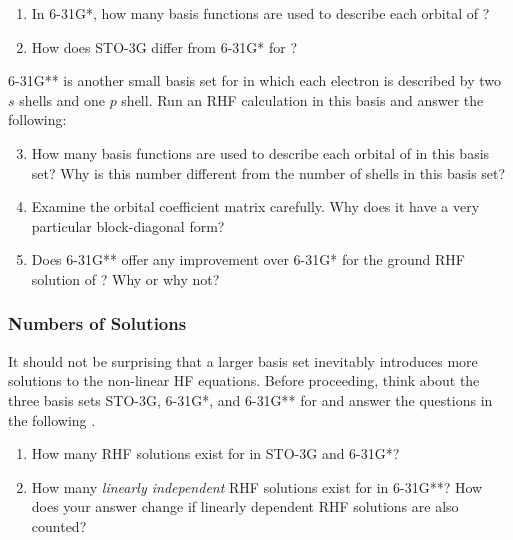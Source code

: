 			\begin{Task}
				\begin{enumerate}[topsep=0pt,itemsep=-1ex,partopsep=1ex,parsep=1ex,label=(\alph*)]
					\item In 6-31G*, how many basis functions are used to describe each orbital of ?
					\item How does STO-3G differ from 6-31G* for ?
				\end{enumerate}
				6-31G** is another small basis set for  in which each electron is described by two $s$ shells and one $p$ shell. Run an RHF calculation in this basis and answer the following:
					\begin{enumerate}[topsep=0pt,itemsep=-1ex,partopsep=1ex,parsep=1ex,label=(\alph*)]
							\setcounter{enumi}{2}
							\item How many basis functions are used to describe each orbital of  in this basis set? Why is this number different from the number of shells in this basis set?
							\item Examine the orbital coefficient matrix carefully. Why does it have a very particular block-diagonal form?
							\item Does 6-31G** offer any improvement over 6-31G* for the ground RHF solution of ? Why or why not?
					\end{enumerate}
			\end{Task}

		
		\subsubsection{Numbers of Solutions}
		
			It should not be surprising that a larger basis set inevitably introduces more solutions to the non-linear HF equations.
			Before proceeding, think about the three basis sets STO-3G, 6-31G*, and 6-31G** for  and answer the questions in the following \namecref{task:numberofsolsHe}.
			
				\begin{Task}
					\label{task:numberofsolsHe}
					\begin{enumerate}[topsep=0pt,itemsep=-1ex,partopsep=1ex,parsep=1ex,label=(\alph*)]
						\item How many RHF solutions exist for  in STO-3G and 6-31G*?
						\item How many \textit{linearly independent} RHF solutions exist for  in 6-31G**? How does your answer change if linearly dependent RHF solutions are also counted?
					\end{enumerate}
				\end{Task}
			
